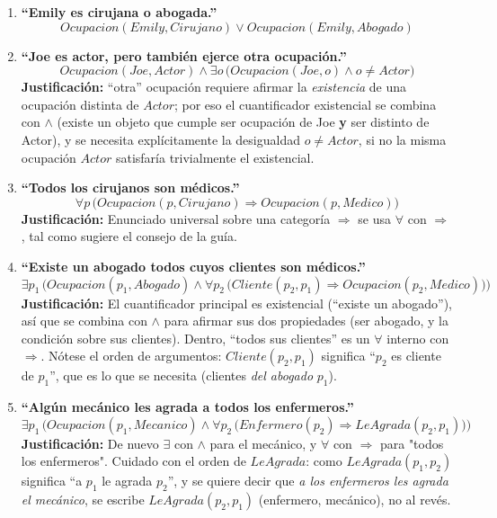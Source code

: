 \begin{enumerate}
    \item \textbf{``Emily es cirujana o abogada.''}
    \[
        Ocupacion(Emily, Cirujano) \lor Ocupacion(Emily, Abogado)
    \]

    \item \textbf{``Joe es actor, pero también ejerce otra ocupación.''}
    \[
        Ocupacion(Joe, Actor) \land \exists o\, \big(Ocupacion(Joe, o) \land o \neq Actor\big)
    \]
    \textbf{Justificación:} ``otra'' ocupación requiere afirmar la \emph{existencia} de una ocupación
    distinta de $Actor$; por eso el cuantificador existencial se combina con $\land$ (existe un
    objeto que cumple ser ocupación de Joe \textbf{y} ser distinto de Actor), y se necesita
    explícitamente la desigualdad $o\neq Actor$, si no la misma ocupación $Actor$ satisfaría
    trivialmente el existencial.

    \item \textbf{``Todos los cirujanos son médicos.''}
    \[
        \forall p\, \big(Ocupacion(p,Cirujano) \Rightarrow Ocupacion(p,Medico)\big)
    \]
    \textbf{Justificación:} Enunciado universal sobre una categoría $\Rightarrow$ se usa
    $\forall$ con $\Rightarrow$, tal como sugiere el consejo de la guía.

    \item \textbf{``Existe un abogado todos cuyos clientes son médicos.''}
    \[
        \exists p_1\, \Big(Ocupacion(p_1,Abogado) \land \forall p_2\,\big(Cliente(p_2,p_1)
        \Rightarrow Ocupacion(p_2,Medico)\big)\Big)
    \]
    \textbf{Justificación:} El cuantificador principal es existencial (``existe un abogado''), así
    que se combina con $\land$ para afirmar sus dos propiedades (ser abogado, y la condición sobre
    sus clientes). Dentro, ``todos sus clientes'' es un $\forall$ interno con $\Rightarrow$. Nótese
    el orden de argumentos: $Cliente(p_2,p_1)$ significa ``$p_2$ es cliente de $p_1$'', que es lo que
    se necesita (clientes \emph{del abogado} $p_1$).

    \item \textbf{``Algún mecánico les agrada a todos los enfermeros.''}
    \[
        \exists p_1\, \Big(Ocupacion(p_1,Mecanico) \land \forall p_2\,\big(Enfermero(p_2)
        \Rightarrow LeAgrada(p_2,p_1)\big)\Big)
    \]
    \textbf{Justificación:} De nuevo $\exists$ con $\land$ para el mecánico, y $\forall$ con
    $\Rightarrow$ para "todos los enfermeros". Cuidado con el orden de $LeAgrada$: como
    $LeAgrada(p_1,p_2)$ significa ``a $p_1$ le agrada $p_2$'', y se quiere decir que \emph{a los
    enfermeros les agrada el mecánico}, se escribe $LeAgrada(p_2, p_1)$ (enfermero, mecánico), no al
    revés.
\end{enumerate}

